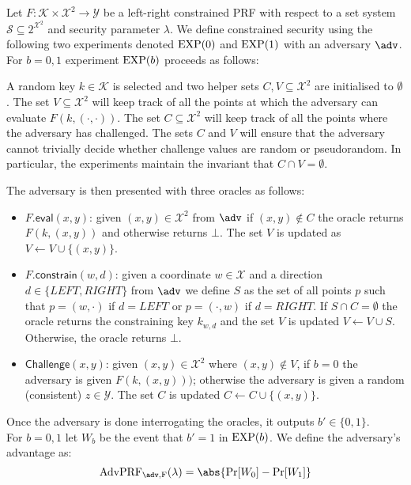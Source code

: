 		\begin{secgame} \label{att:lrPRF}
		Let $F: \mathcal{K} \times \mathcal{X}^2 \rightarrow \mathcal{Y}$ be a left-right constrained PRF with respect to a set system $\mathcal{S} \subseteq 2^{\mathcal{X}^2}$ and security parameter $\lambda$. We define constrained security using the following two experiments denoted $\mathrm{EXP}({0})$ and $\mathrm{EXP}({1})$ with an adversary $\adv$. For $b=0,1$ experiment $\mathrm{EXP}({b})$ proceeds as follows:

			A random key $k \in \mathcal{K}$ is selected and two helper sets $C,V \subseteq \mathcal{X}^2$ are initialised to $\emptyset$. The set $V \subseteq \mathcal{X}^2$ will keep track of all the points at which the adversary can evaluate $F(k, (\cdot,\cdot))$. The set $C \subseteq \mathcal{X}^2$ will keep track of all the points where the adversary has challenged. The sets $C$ and $V$ will ensure that the adversary cannot trivially decide whether challenge values are random or pseudorandom. In particular, the experiments maintain the invariant that $C \cap V = \emptyset$.

The adversary is then presented with three oracles as follows:

\begin{itemize}
	\item $F.\mathsf{eval}(x,y)$: given $(x,y) \in \mathcal{X}^2$ from $\adv$ if $(x,y) \notin C$ the oracle returns $F(k, (x,y))$ and otherwise returns $\bot$. The set $V$ is updated as $V\leftarrow V \cup \{(x,y)\}$.
	\item $F.\mathsf{constrain}(w,d)$: given a coordinate $w \in \mathcal{X}$ and a direction $d \in \{LEFT,RIGHT\}$ from $\adv$ we define $S$ as the set of all points $p$ such that $p = (w, \cdot)$ if $d=LEFT$ or $p = (\cdot, w)$ if $d=RIGHT$. If $S\cap C= \emptyset$ the oracle returns the constraining key $k_{w, d}$ and the set $V$ is updated $V\leftarrow V \cup S$. Otherwise, the oracle returns $\bot$.
	\item $\mathsf{Challenge}(x,y)$: given $(x,y)\in \mathcal{X}^2$ where $(x,y) \notin V$, if $b=0$ the adversary is given $F(k, (x,y)))$; otherwise the adversary is given a random (consistent) $z \in \mathcal{Y}$. The set $C$ is updated $C \leftarrow C \cup \{(x,y)\}$.
\end{itemize}
			Once the adversary is done interrogating the oracles, it outputs $b' \in \{0,1\}$.\\
			
			\noindent For $b = 0,1$ let $W_b$ be the event that $b'=1$ in $\mathrm{EXP}({b})$. We define the adversary's advantage as: \begin{equation} \label{eq:advLRPRF}
				\mathrm{AdvPRF_{\adv, F}}(\lambda) = \abs{\mathrm{Pr}[W_0] - \mathrm{Pr}[W_1]}
			\end{equation}
		\end{secgame}
		
